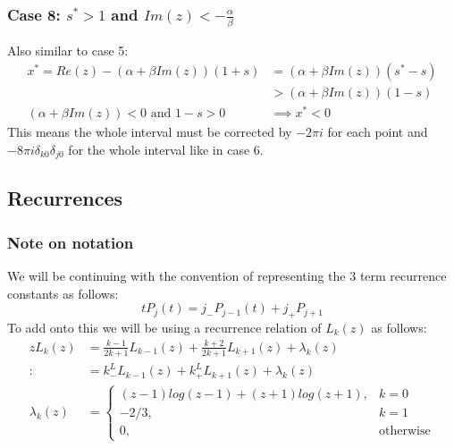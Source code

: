 \documentclass{article}
\begin{document}
\subsubsection{Case 8:  $s^*>1$ and $Im(z)<-\frac{\alpha}{\beta}$}
Also similar to case 5:
\begin{align}
    x^*=Re(z)-(\alpha+\beta Im(z))(1+s)&=(\alpha+\beta Im(z))(s^*-s)\\
    &>(\alpha+\beta Im(z))(1-s)\\
    (\alpha+\beta Im(z))<0 \text{ and } 1-s>0 &\implies x^*<0
\end{align}
This means the whole interval must be corrected by $-2\pi i$ for each point and $-8\pi i\delta_{k0}\delta_{j0}$ for the whole interval like in case 6.

\subsection{Recurrences}
\subsubsection{Note on notation}
We will be continuing with the convention of representing the 3 term recurrence constants as follows:
$$tP_j(t)=j_-P_{j-1}(t)+j_+P_{j+1}$$
To add onto this we will be using a recurrence relation of $L_k(z)$ as follows:
\begin{align}
    zL_k(z) &= \frac{k-1}{2k+1}L_{k-1}(z)+\frac{k+2}{2k+1}L_{k+1}(z)+\lambda_k(z)\\
    :&= k_-^LL_{k-1}(z)+k_+^LL_{k+1}(z)+\lambda_k(z)\\
    \lambda_k(z) &= \begin{cases}
	(z-1)log(z-1)+(z+1)log(z+1),&k=0\\
	-2/3,&k=1\\
	0,&\text{otherwise}
    \end{cases}
\end{align}
\end{document}

